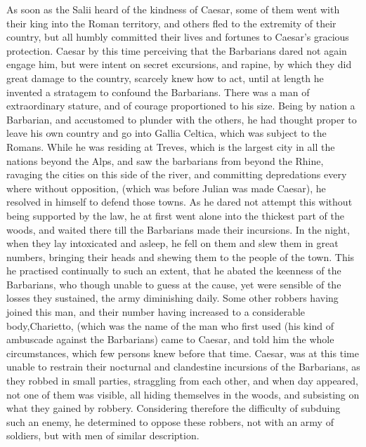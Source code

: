 As soon as the Salii heard of the kindness of Caesar, some of them went with their king into the Roman territory, and others fled to the extremity of their country, but all humbly committed their lives and fortunes to Caesar's gracious protection. Caesar by this time perceiving that the Barbarians dared not again engage him, but were intent on secret excursions, and rapine, by which they did great damage to the country, scarcely knew how to act, until at length he invented a stratagem to confound the Barbarians. There was a man of extraordinary stature, and of courage proportioned to his size. Being by nation a Barbarian, and accustomed to plunder with the others, he had thought proper to leave his own country and go into Gallia Celtica, which was subject to the Romans. While he was residing at Treves, which is the largest city in all the nations beyond the Alps, and saw the barbarians from beyond the Rhine, ravaging the cities on this side of the river, and committing depredations every where without opposition, (which was before Julian was made Caesar), he resolved in himself to defend those towns. As he dared not attempt this without being supported by the law, he at first went alone into the thickest part of the woods, and waited there till the Barbarians made their incursions. In the night, when they lay intoxicated and asleep, he fell on them and slew them in great numbers, bringing their heads and shewing them to the people of the town. This he practised continually to such an extent, that he abated the keenness of the Barbarians, who though unable to guess at the cause, yet were sensible of the losses they sustained, the army diminishing daily. Some other robbers having joined this man, and their number having increased to a considerable body,\emph{}Charietto, (which was the name of the man who first used (his kind of ambuscade against the Barbarians) came to Caesar, and told him the whole circumstances, which few persons knew before that time. Caesar, was at this time unable to restrain their nocturnal and clandestine incursions of the Barbarians, as they robbed in small parties, straggling from each other, and when day appeared, not one of them was visible, all hiding themselves in the woods, and subsisting on what they gained by robbery. Considering therefore the difficulty of subduing such an enemy, he determined to oppose these robbers, not with an army of soldiers, but with men of similar description.


